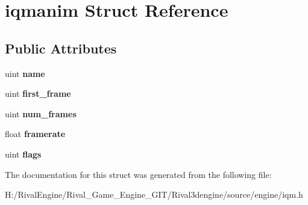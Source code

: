 \hypertarget{structiqmanim}{}\section{iqmanim Struct Reference}
\label{structiqmanim}
\subsection*{Public Attributes}
\begin{DoxyCompactItemize}
\item 
\mbox{\label{structiqmanim_a2f620572e8ded948f77fc5380572f587}} 
uint {\bfseries name}
\item 
\mbox{\label{structiqmanim_a466af523e872ff639f10a9def8109ef8}} 
uint {\bfseries first\+\_\+frame}
\item 
\mbox{\label{structiqmanim_a2eebe6ae7ed7777fa9713cc39061b7c1}} 
uint {\bfseries num\+\_\+frames}
\item 
\mbox{\label{structiqmanim_a1b9cc8e8007034466f64156713206507}} 
float {\bfseries framerate}
\item 
\mbox{\label{structiqmanim_a5e1eaac6b229dd86d37b043cb81a50fe}} 
uint {\bfseries flags}
\end{DoxyCompactItemize}


The documentation for this struct was generated from the following file\+:\begin{DoxyCompactItemize}
\item 
H\+:/\+Rival\+Engine/\+Rival\+\_\+\+Game\+\_\+\+Engine\+\_\+\+G\+I\+T/\+Rival3dengine/source/engine/iqm.\+h\end{DoxyCompactItemize}
